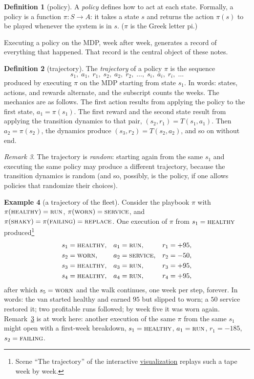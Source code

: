 \documentclass[11pt,a4paper]{article}
\theoremstyle{definition}
\newtheorem{definition}{Definition}[section]
\newtheorem{example}[definition]{Example}
\theoremstyle{remark}
\newtheorem{remark}[definition]{Remark}
\numberwithin{equation}{section}
\newcommand{\sa}[1]{\textsc{#1}}   %
\newcommand{\vizhref}[1]{\href{https://sml-fs26.github.io/classic_rl/repair-or-replace/}{#1}}
\begin{document}
\begin{definition}[policy]
A \emph{policy} defines how to act at each state. Formally, a policy is a function
$\pi \colon S \to A$: it takes a state $s$ and returns the action $\pi(s)$ to be played
whenever the system is in $s$. ($\pi$ is the Greek letter pi.)
\end{definition}

Executing a policy on the MDP, week after week, generates a record of everything that
happened. That record is the central object of these notes.

\begin{definition}[trajectory]
The \emph{trajectory} of a policy $\pi$ is the sequence
\[
s_1,\; a_1,\; r_1,\; s_2,\; a_2,\; r_2,\; \dots,\; s_i,\; a_i,\; r_i,\; \dots
\]
produced by executing $\pi$ on the MDP starting from state $s_1$. In words: states, actions,
and rewards alternate, and the subscript counts the weeks. The mechanics are as follows. The
first action results from applying the policy to the first state, $a_1 = \pi(s_1)$. The first
reward and the second state result from applying the transition dynamics to that pair,
$(s_2, r_1) = T(s_1, a_1)$. Then $a_2 = \pi(s_2)$, the dynamics produce
$(s_3, r_2) = T(s_2, a_2)$, and so on without end.
\end{definition}

\begin{remark}\label{rem:randomtraj}
The trajectory is \emph{random}: starting again from the same $s_1$ and executing the same
policy may produce a different trajectory, because the transition dynamics is random (and so,
possibly, is the policy, if one allows policies that randomize their choices).
\end{remark}

\begin{example}[a trajectory of the fleet]\label{ex:trajectory}
Consider the playbook $\pi$ with $\pi(\sa{healthy}) = \sa{run}$,
$\pi(\sa{worn}) = \sa{service}$, and $\pi(\sa{shaky}) = \pi(\sa{failing}) = \sa{replace}$.
One execution of $\pi$ from $s_1 = \sa{healthy}$ produced\footnote{Scene ``The trajectory''
of the interactive \vizhref{visualization} replays such a tape week by week.}
\begin{align*}
s_1 &= \sa{healthy}, & a_1 &= \sa{run},     & r_1 &= +95,\\
s_2 &= \sa{worn},    & a_2 &= \sa{service}, & r_2 &= -50,\\
s_3 &= \sa{healthy}, & a_3 &= \sa{run},     & r_3 &= +95,\\
s_4 &= \sa{healthy}, & a_4 &= \sa{run},     & r_4 &= +95,
\end{align*}
after which $s_5 = \sa{worn}$ and the walk continues, one week per step, forever. In words:
the van started healthy and earned $95$ but slipped to worn; a $50$ service restored it; two
profitable runs followed; by week five it was worn again. Remark~\ref{rem:randomtraj} is at
work here: another execution of the same $\pi$ from the same $s_1$ might open with a
first-week breakdown, $s_1 = \sa{healthy}$, $a_1 = \sa{run}$, $r_1 = -185$,
$s_2 = \sa{failing}$.
\end{example}
\end{document}
